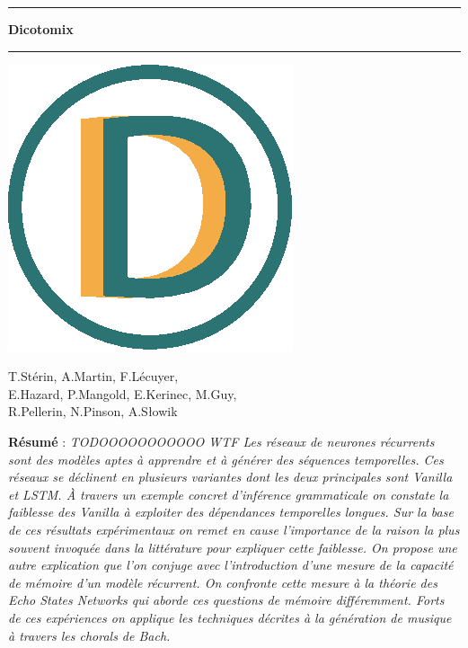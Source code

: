 \documentclass[11pt,a4paper]{article}
\theoremstyle{plain}
\theoremstyle{definition}
\begin{document}
\begin{center}


\vspace{1.5cm}

\rule[11pt]{5cm}{0.5pt}

\textbf{\huge Dicotomix}

\rule{5cm}{0.5pt}
\vspace{0.5cm}

\includegraphics[scale=0.7]{images/icon.eps}

\vspace{0.5cm}

T.Stérin, A.Martin, F.Lécuyer, \\ E.Hazard, P.Mangold, E.Kerinec, M.Guy, \\ R.Pellerin, N.Pinson, A.Słowik

\vspace{1.5cm}

\parbox{15cm}{\small
\textbf{Résumé} : \it TODOOOOOOOOOOO WTF Les réseaux de neurones récurrents sont des modèles aptes à apprendre et à générer des séquences temporelles. Ces réseaux se déclinent en plusieurs variantes dont les deux principales sont Vanilla et LSTM. À travers un exemple concret d'inférence grammaticale on constate la faiblesse des Vanilla à exploiter des dépendances temporelles longues. Sur la base de ces résultats expérimentaux on remet en cause l'importance de la raison la plus souvent invoquée dans la littérature pour expliquer cette faiblesse. On propose une autre explication que l'on conjuge avec l'introduction d'une mesure de la capacité de mémoire d'un modèle récurrent. On confronte cette mesure à la théorie des Echo States Networks qui aborde ces questions de mémoire différemment. Forts de ces expériences on applique les techniques décrites à la génération de musique à travers les chorals de Bach.

}
\end{center}
\end{document}
